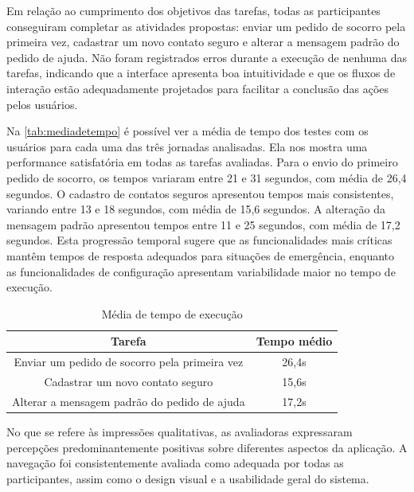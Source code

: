 Em relação ao cumprimento dos objetivos das tarefas, todas as participantes conseguiram completar as atividades propostas: enviar um pedido de socorro pela primeira vez, cadastrar um novo contato seguro e alterar a mensagem padrão do pedido de ajuda. Não foram registrados erros durante a execução de nenhuma das tarefas, indicando que a interface apresenta boa intuitividade e que os fluxos de interação estão adequadamente projetados para facilitar a conclusão das ações pelos usuários.

Na \autoref{tab:mediadetempo} é possível ver a média de tempo dos testes com os usuários para cada uma das três jornadas analisadas. Ela nos mostra uma performance satisfatória em todas as tarefas avaliadas. Para o envio do primeiro pedido de socorro, os tempos variaram entre 21 e 31 segundos, com média de 26,4 segundos. O cadastro de contatos seguros apresentou tempos mais consistentes, variando entre 13 e 18 segundos, com média de 15,6 segundos. A alteração da mensagem padrão apresentou tempos entre 11 e 25 segundos, com média de 17,2 segundos. Esta progressão temporal sugere que as funcionalidades mais críticas mantêm tempos de resposta adequados para situações de emergência, enquanto as funcionalidades de configuração apresentam variabilidade maior no tempo de execução.

\begin{table}[htbp]
	\centering
	\caption[Média de tempo de execução]{Média de tempo de execução}
	\label{tab:mediadetempo}
	\begin{tabular}{cc}
		\hline
		\multicolumn{1}{|c|}{Tarefa}                                        & \multicolumn{1}{c|}{Tempo médio}            \\ \hline \hline
		\multicolumn{1}{|c|}{Enviar um pedido de socorro pela primeira vez} & \multicolumn{1}{c|}{26,4s} \\ \hline
		\multicolumn{1}{|c|}{Cadastrar um novo contato seguro}              & \multicolumn{1}{c|}{15,6s} \\ \hline
		\multicolumn{1}{|c|}{Alterar a mensagem padrão do pedido de ajuda}  & \multicolumn{1}{c|}{17,2s} \\ \hline
	\end{tabular}
\end{table}


No que se refere às impressões qualitativas, as avaliadoras expressaram percepções predominantemente positivas sobre diferentes aspectos da aplicação. A navegação foi consistentemente avaliada como adequada por todas as participantes, assim como o design visual e a usabilidade geral do sistema.

